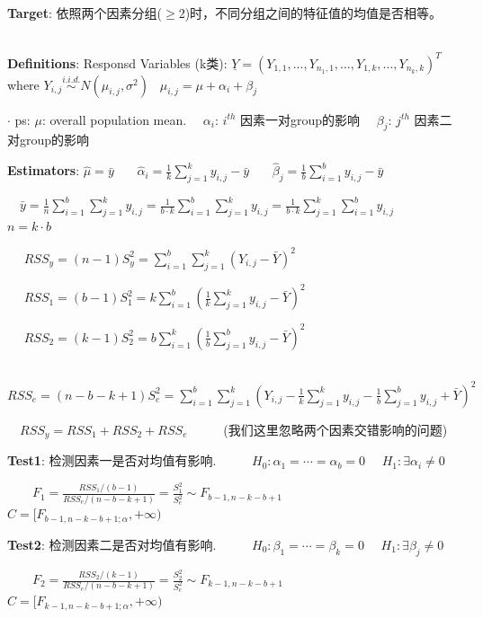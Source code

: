 \documentclass[9pt]{article}
\begin{document}
    \textbf{Target}: 依照两个因素分组($\geq$2)时，不同分组之间的特征值的均值是否相等。 \ \ \ 

    \textbf{Definitions}: Responsd Variables (k类): $\underline{Y}=(Y_{1,1},...,Y_{n_1,1},...,Y_{1,k},...,Y_{n_k,k})^T$ where $Y_{i,j}\stackrel{i.i.d.}{\sim}N(\mu_{i,j},\sigma^2)$ \ $\mu_{i,j}=\mu+\alpha_i+\beta_j$

$\cdot$ ps: $\mu$: overall population mean. \ \ $\alpha_i$: $i^{th}$ 因素一对group的影响 \ \ $\beta_j$: $j^{th}$ 因素二对group的影响

    \textbf{Estimators}: $\hat{\mu}=\bar{y}$ \ \ \ $\hat{\alpha}_i=\frac{1}{k}\sum_{j=1}^{k}y_{i,j}-\bar{y}$ \ \ \ $\hat{\beta}_j=\frac{1}{b}\sum_{i=1}^{b}y_{i,j}-\bar{y}$ \ \ \ 

    \ \ $\bar{y}=\frac{1}{n}\sum_{i=1}^{b}\sum_{j=1}^{k}y_{i,j}=\frac{1}{b\cdot k}\sum_{i=1}^{b}\sum_{j=1}^{k}y_{i,j}=\frac{1}{b\cdot k}\sum_{j=1}^{k}\sum_{i=1}^{b}y_{i,j}$ \ \ \ $n=k\cdot b$

    \ \  $RSS_y=(n-1)S^2_y=\sum_{i=1}^{b}\sum_{j=1}^{k}(Y_{i,j}-\bar{Y})^2$

    \ \  $RSS_1=(b-1)S^2_1=k\sum_{i=1}^{b}(\frac{1}{k}\sum_{j=1}^{k}y_{i,j}-\bar{Y})^2$

    \ \  $RSS_2=(k-1)S^2_2=b\sum_{i=1}^{k}(\frac{1}{b}\sum_{j=1}^{b}y_{i,j}-\bar{Y})^2$

    \ \  $RSS_e=(n-b-k+1)S^2_e=\sum_{i=1}^{b}\sum_{j=1}^{k}(Y_{i,j}-\frac{1}{k}\sum_{j=1}^{k}y_{i,j}-\frac{1}{b}\sum_{j=1}^{b}y_{i,j}+\bar{Y})^2$

    \ \ $RSS_y=RSS_1+RSS_2+RSS_e$ \ \ \ \ \ (我们这里忽略两个因素交错影响的问题)

    \textbf{Test1}: 检测因素一是否对均值有影响. \ \ \ \ \ $H_0:\alpha_1=\cdots=\alpha_b=0$ \ \ $H_1:\exists\alpha_i\ne 0$

    \ \ \ \ $F_1=\frac{RSS_1/(b-1)}{RSS_e/(n-b-k+1)}=\frac{S^2_1}{S^2_e}\sim F_{b-1,n-k-b+1}$ \ \ \ \ \ $C=[F_{b-1,n-k-b+1;\alpha},+\infty)$

    \textbf{Test2}: 检测因素二是否对均值有影响. \ \ \ \ \ $H_0:\beta_1=\cdots=\beta_k=0$ \ \ $H_1:\exists\beta_j\ne 0$

    \ \ \ \ $F_2=\frac{RSS_2/(k-1)}{RSS_e/(n-b-k+1)}=\frac{S^2_2}{S^2_e}\sim F_{k-1,n-k-b+1}$ \ \ \ \ \ $C=[F_{k-1,n-k-b+1;\alpha},+\infty)$
\end{document}
